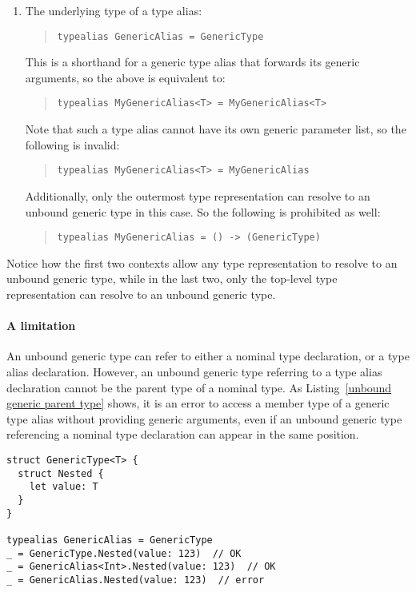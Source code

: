\documentclass[../generics]{subfiles}
\begin{document}
\begin{enumerate}
\item The underlying type of a type alias:
\begin{quote}
\begin{verbatim}
typealias GenericAlias = GenericType
\end{verbatim}
\end{quote}
This is a shorthand for a generic type alias that forwards its generic arguments, so the above is equivalent to:
\begin{quote}
\begin{verbatim}
typealias MyGenericAlias<T> = MyGenericAlias<T>
\end{verbatim}
\end{quote}
Note that such a type alias cannot have its own generic parameter list, so the following is invalid:
\begin{quote}
\begin{verbatim}
typealias MyGenericAlias<T> = MyGenericAlias
\end{verbatim}
\end{quote}
Additionally, only the outermost type representation can resolve to an unbound generic type in this case. So the following is prohibited as well:
\begin{quote}
\begin{verbatim}
typealias MyGenericAlias = () -> (GenericType)
\end{verbatim}
\end{quote}
\end{enumerate}
Notice how the first two contexts allow any type representation to resolve to an unbound generic type, while in the last two, only the top-level type representation can resolve to an unbound generic type.

\paragraph{A limitation} An unbound generic type can refer to either a nominal type declaration, or a type alias declaration. However, an unbound generic type referring to a type alias declaration cannot be the parent type of a nominal type. As Listing~\ref{unbound generic parent type} shows, it is an error to access a member type of a generic type alias without providing generic arguments, even if an unbound generic type referencing a nominal type declaration can appear in the same position.
\begin{listing}\label{unbound generic parent type}
\begin{Verbatim}
struct GenericType<T> {
  struct Nested {
    let value: T
  }
}

typealias GenericAlias = GenericType
_ = GenericType.Nested(value: 123)  // OK
_ = GenericAlias<Int>.Nested(value: 123)  // OK
_ = GenericAlias.Nested(value: 123)  // error
\end{Verbatim}
\end{listing}
\end{document}
